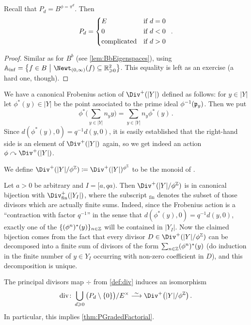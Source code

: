 \documentclass[a4paper, 10pt, oneside, DIV=9, chapterprefix=true, numbers=enddot,bibliography=totoc]{scrbook}
\begin{document}
\begin{lem}\label{lem:PEigenspaces}
	Recall that $P_d=B^{\phi=\pi^d}$. Then
	\begin{equation*}
		P_d=\begin{cases*}
			E & if $d=0$\\
			0 & if $d<0$\\
			\text{complicated} & if $d>0$
		\end{cases*}\,.
	\end{equation*}
\end{lem}
\begin{proof}
	Similar as for $B^b$ (see \cref{lem:BbEigenspaces}), using $\IA_\inf=\left\{f\in B\st\Newt_{(0,\infty)}(f)\subseteq \IR_{\geq 0}^2\right\}$. This equality is left as an exercise (a hard one, though).
\end{proof}
We have a canonical Frobenius action of $\Div^+(|Y|)$ defined as follows: for $y\in|Y|$ let $\phi^*(y)\in |Y|$ be the point associated to the prime ideal $\phi^{-1}(\pp_y)$. Then we put
\begin{equation*}
	\phi^*\Bigg(\sum_{y\in|Y|}n_yy\Bigg)=\sum_{y\in|Y|}n_y\phi^*(y)\,.
\end{equation*}
Since $d(\phi^*(y),0)=q^{-1}d(y,0)$, it is easily established that the right-hand side is an element of $\Div^+(|Y|)$ again, so we get indeed an action $\phi\curvearrowright \Div^+(|Y|)$.
\begin{defi}
	We define $\Div^+(|Y|/\phi^\IZ)\coloneqq \Div^+(|Y|)^{\phi^\IZ}$ to be the monoid of . 
\end{defi}
\begin{rem}\label{rem:Div+}
	Let $a>0$ be arbitrary and $I=[a,qa)$. Then $\Div^+(|Y|/\phi^\IZ)$ is in canonical bijection with $\Div^+_\mathrm{fin}(|Y_I|)$, where the subscript $_\mathrm{fin}$ denotes the subset of those divisors which are actually finite sums. Indeed, since the Frobenius action is a \enquote{contraction with factor $q^{-1}$} in the sense that $d(\phi^*(y),0)=q^{-1}d(y,0)$, exactly one of the $\{(\phi^n)^*(y)\}_{n\in\IZ}$ will be contained in $|Y_I|$. Now the claimed bijection comes from the fact that every divisor $D\in \Div^+(|Y|/\phi^\IZ)$ can be decomposed into a finite sum of divisors of the form $\sum_{n\in\IZ}(\phi^n)^*(y)$ (do induction in the finite number of $y\in Y_I$ occurring with non-zero coefficient in $D$), and this decomposition is unique.
\end{rem}
\begin{thm}\label{thm:divIso}
	The principal divisors map $\div$ from \cref{def:div} induces an isomorphism
	\begin{equation*}
		\div\colon\bigcup_{d\geq 0}\big(P_d\setminus\{0\}\big)/E^\times\isomorphism \Div^+\big(|Y|/\phi^\IZ\big)\,.
	\end{equation*}
	In particular, this implies \cref{thm:PGradedFactorial}.
\end{thm}
\end{document}
